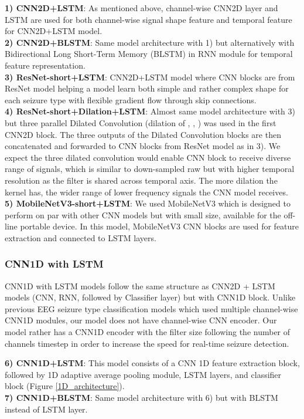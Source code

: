 \documentclass[pmlr,twocolumn,10pt]{jmlr}
\begin{document}
\noindent\textbf{1) CNN2D+LSTM}: As mentioned above, channel-wise CNN2D layer and LSTM are used for both channel-wise signal shape feature and temporal feature for CNN2D+LSTM model.\\
\noindent\textbf{2) CNN2D+BLSTM}: Same model architecture with 1) but alternatively with Bidirectional Long Short-Term Memory (BLSTM) in RNN module for temporal feature representation.\\
\noindent\textbf{3) ResNet-short+LSTM}: CNN2D+LSTM model where CNN blocks are from ResNet model \citep{he2016deep} helping a model learn both simple and rather complex shape for each seizure type with flexible gradient flow through skip connections.\\
\noindent\textbf{4) ResNet-short+Dilation+LSTM}: Almost same model architecture with 3) but three parallel Dilated Convolution (dilation of , , ) was used in the first CNN2D block. The three outputs of the Dilated Convolution blocks are then concatenated and forwarded to CNN blocks from ResNet model as in 3). We expect the three dilated convolution would enable CNN block to receive diverse range of signals, which is similar to down-sampled raw \citep{mohsenvand2020contrastive} but with higher temporal resolution as the filter is shared across temporal axis. The more dilation the kernel has, the wider range of lower frequency signals the CNN model receives.\\
\noindent\textbf{5) MobileNetV3-short+LSTM}: We used MobileNetV3 \cite{howard2019searching} which is designed to perform on par with other CNN models but with small size, available for the off-line portable device. In this model, MobileNetV3 CNN blocks are used for feature extraction and connected to LSTM layers. 

\subsubsection{CNN1D with LSTM}
CNN1D with LSTM models follow the same structure as CNN2D + LSTM models (CNN, RNN, followed by Classifier layer) but with CNN1D block. Unlike previous EEG seizure type classification models \citep{priyasad2021interpretable, mohsenvand2020contrastive} which used multiple channel-wise CNN1D modules, our model does not have channel-wise CNN encoder. Our model rather has a CNN1D encoder with the filter size following the number of channels  timestep in order to increase the speed for real-time seizure detection.

\noindent\textbf{6) CNN1D+LSTM}: This model consists of a CNN 1D feature extraction block, followed by 1D adaptive average pooling module, LSTM layers, and classifier block (Figure \ref{1D_architecture}).\\
\textbf{7) CNN1D+BLSTM}: Same model architecture with 6) but with BLSTM instead of LSTM layer.
\end{document}
